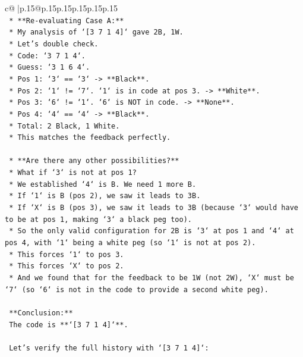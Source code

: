 \documentclass{article}
\begin{document}
{\begin{supertabular}{c@{$\;$}|p{.15\linewidth}@{}p{.15\linewidth}p{.15\linewidth}p{.15\linewidth}p{.15\linewidth}p{.15\linewidth}}
{{{\\ 
\texttt{    *   **Re{-}evaluating Case A:**} \\
\texttt{        *   My analysis of `{[}3 7 1 4{]}` gave 2B, 1W.} \\
\texttt{        *   Let's double check.} \\
\texttt{        *   Code: `3 7 1 4`.} \\
\texttt{        *   Guess: `3 1 6 4`.} \\
\texttt{        *   Pos 1: `3` == `3` {-}> **Black**.} \\
\texttt{        *   Pos 2: `1` != `7`. `1` is in code at pos 3. {-}> **White**.} \\
\texttt{        *   Pos 3: `6` != `1`. `6` is NOT in code. {-}> **None**.} \\
\texttt{        *   Pos 4: `4` == `4` {-}> **Black**.} \\
\texttt{        *   Total: 2 Black, 1 White.} \\
\texttt{        *   This matches the feedback perfectly.} \\
\\ 
\texttt{    *   **Are there any other possibilities?**} \\
\texttt{        *   What if `3` is not at pos 1?} \\
\texttt{        *   We established `4` is B. We need 1 more B.} \\
\texttt{        *   If `1` is B (pos 2), we saw it leads to 3B.} \\
\texttt{        *   If `X` is B (pos 3), we saw it leads to 3B (because `3` would have to be at pos 1, making `3` a black peg too).} \\
\texttt{        *   So the only valid configuration for 2B is `3` at pos 1 and `4` at pos 4, with `1` being a white peg (so `1` is not at pos 2).} \\
\texttt{        *   This forces `1` to pos 3.} \\
\texttt{        *   This forces `X` to pos 2.} \\
\texttt{        *   And we found that for the feedback to be 1W (not 2W), `X` must be `7` (so `6` is not in the code to provide a second white peg).} \\
\\ 
\texttt{    **Conclusion:**} \\
\texttt{    The code is **`{[}3 7 1 4{]}`**.} \\
\\ 
\texttt{    Let's verify the full history with `{[}3 7 1 4{]}`:} \\
}}}
\end{supertabular}}
\end{document}
